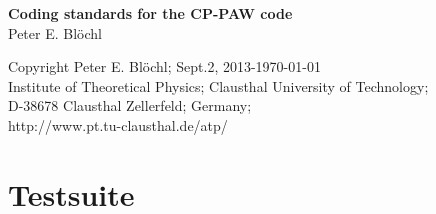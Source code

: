 \documentclass[11pt,a4paper]{report}
\begin{document}
\begin{titlepage}
\begin{center}
\vspace*{3.5cm}
{\huge \textbf{Coding standards for the CP-PAW code}}\\
\vspace{0.5cm}
{\large Peter E. Bl\"ochl}
\vspace{0.5cm} 
\end{center}

\vfill
\begin{center}
Copyright Peter E. Bl\"ochl; Sept.2, 2013-\today\\
{\small
Institute of Theoretical Physics;
Clausthal University of Technology;\\ 
D-38678 Clausthal Zellerfeld; Germany;\\
http://www.pt.tu-clausthal.de/atp/}
\end{center}
\end{titlepage}
\noindent            
\tableofcontents
\chapter{Testsuite}
\cite{bloechl94_prb50_17953}
\end{document}
